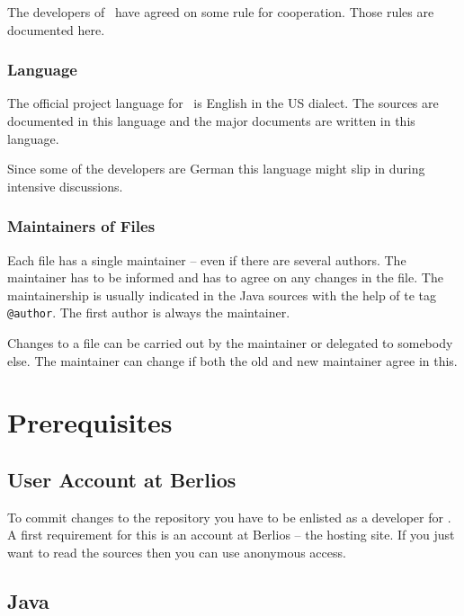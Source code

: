 \documentclass{extex-doc}
\begin{document}
The developers of \ExTeX\ have agreed on some rule for cooperation.
Those rules are documented here.

\subsection{Language}

The official project language for \ExTeX\ is English in the US
dialect. The sources are documented in this language and the major
documents are written in this language.

Since some of the developers are German this language might slip in
during intensive discussions.


\subsection{Maintainers of Files}

Each file has a single maintainer -- even if there are several
authors. The maintainer has to be informed and has to agree on any
changes in the file. The maintainership is usually indicated in the
Java sources with the help of te tag \texttt{@author}. The first
author is always the maintainer.

Changes to a file can be carried out by the maintainer or delegated to
somebody else. The maintainer can change if both the old and new
maintainer agree in this.




\chapter{Prerequisites}

\section{User Account at Berlios}

To commit changes to the repository you have to be enlisted as a
developer for \ExTeX. A first requirement for this is an account at
Berlios -- the hosting site. If you just want to read the sources then
you can use anonymous access.



\section{Java}
\end{document}
